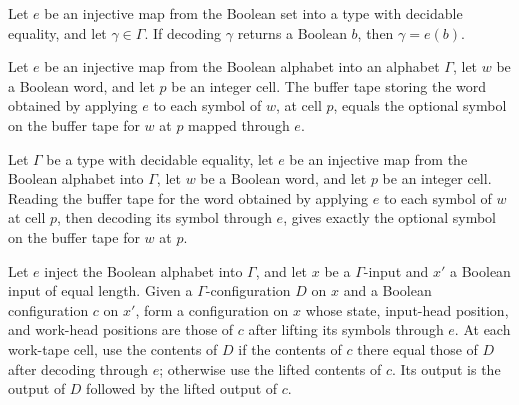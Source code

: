 \begin{theorem}
\label{Turing.decodeBool_eq_some}
\leanok
{}
Let $e$ be an injective map from the Boolean set into a type with decidable equality,
and let $\gamma\in\Gamma$. If decoding $\gamma$ returns a Boolean $b$, then
$\gamma=e(b)$.
\end{theorem}

\begin{theorem}
\label{Turing.FinTM.bufferTape_map}
\leanok
{}
Let $e$ be an injective map from the Boolean alphabet into an alphabet $\Gamma$, let $w$
be a Boolean word, and let $p$ be an integer cell. The buffer tape storing the word
obtained by applying $e$ to each symbol of $w$, at cell $p$, equals the optional symbol
on the buffer tape for $w$ at $p$ mapped through $e$.
\end{theorem}

\begin{theorem}
\label{Turing.FinTM.bufferTape_map_decode}
\leanok
{}
Let $\Gamma$ be a type with decidable equality, let $e$ be an injective map from the
Boolean alphabet into $\Gamma$, let $w$ be a Boolean word, and let $p$ be an integer
cell. Reading the buffer tape for the word obtained by applying $e$ to each symbol of
$w$ at cell $p$, then decoding its symbol through $e$, gives exactly the optional symbol
on the buffer tape for $w$ at $p$.
\end{theorem}

\begin{definition}
\label{Turing.Cfg.liftOver}
\leanok
{}
Let $e$ inject the Boolean alphabet into $\Gamma$, and let $x$ be a $\Gamma$-input and
$x'$ a Boolean input of equal length. Given a $\Gamma$-configuration $D$ on $x$ and a
Boolean configuration $c$ on $x'$, form a configuration on $x$ whose state, input-head
position, and work-head positions are those of $c$ after lifting its symbols through
$e$. At each work-tape cell, use the contents of $D$ if the contents of $c$ there equal
those of $D$ after decoding through $e$; otherwise use the lifted contents of $c$. Its
output is the output of $D$ followed by the lifted output of $c$.
\end{definition}

